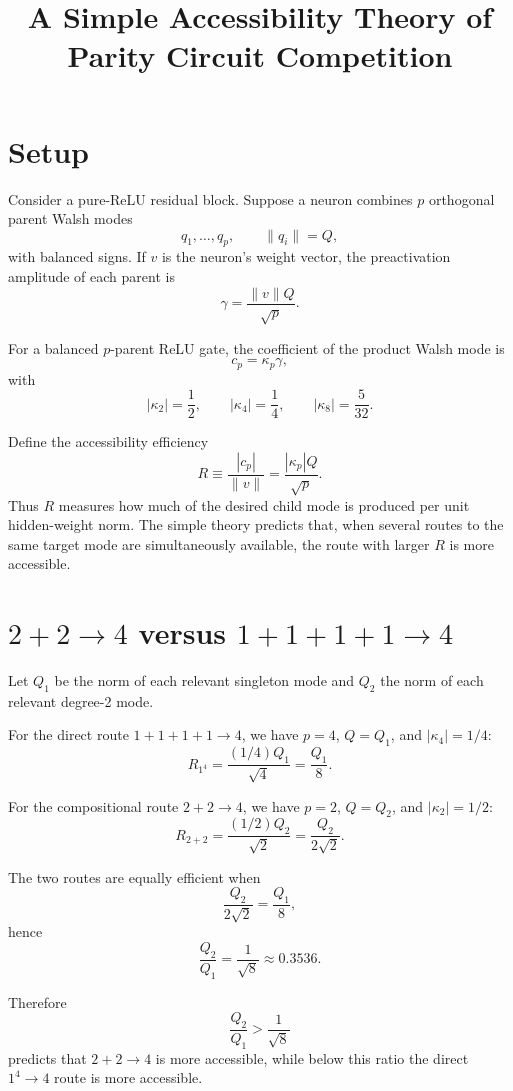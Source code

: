 \documentclass[11pt]{article}
\title{A Simple Accessibility Theory of Parity Circuit Competition}
\date{}
\begin{document}
\maketitle

\section{Setup}

Consider a pure-ReLU residual block. Suppose a neuron combines \(p\) orthogonal parent Walsh modes
\[
q_1,\ldots,q_p,\qquad \|q_i\|=Q,
\]
with balanced signs. If \(v\) is the neuron's weight vector, the preactivation amplitude of each parent is
\[
\gamma=\frac{\|v\|Q}{\sqrt p}.
\]

For a balanced \(p\)-parent ReLU gate, the coefficient of the product Walsh mode is
\[
c_p=\kappa_p\gamma,
\]
with
\[
|\kappa_2|=\frac12,\qquad
|\kappa_4|=\frac14,\qquad
|\kappa_8|=\frac{5}{32}.
\]

Define the accessibility efficiency
\[
R\equiv \frac{|c_p|}{\|v\|}
=\frac{|\kappa_p|Q}{\sqrt p}.
\]
Thus \(R\) measures how much of the desired child mode is produced per unit hidden-weight norm. The simple theory predicts that, when several routes to the same target mode are simultaneously available, the route with larger \(R\) is more accessible.

\section{\texorpdfstring{\(2+2\to4\)}{2+2 to 4} versus \texorpdfstring{\(1+1+1+1\to4\)}{1+1+1+1 to 4}}

Let \(Q_1\) be the norm of each relevant singleton mode and \(Q_2\) the norm of each relevant degree-2 mode.

For the direct route \(1+1+1+1\to4\), we have \(p=4\), \(Q=Q_1\), and \(|\kappa_4|=1/4\):
\[
R_{1^4}
=
\frac{(1/4)Q_1}{\sqrt4}
=
\frac{Q_1}{8}.
\]

For the compositional route \(2+2\to4\), we have \(p=2\), \(Q=Q_2\), and \(|\kappa_2|=1/2\):
\[
R_{2+2}
=
\frac{(1/2)Q_2}{\sqrt2}
=
\frac{Q_2}{2\sqrt2}.
\]

The two routes are equally efficient when
\[
\frac{Q_2}{2\sqrt2}
=
\frac{Q_1}{8},
\]
hence
\[
\boxed{
\frac{Q_2}{Q_1}
=
\frac{1}{\sqrt8}
\approx 0.3536.
}
\]

Therefore
\[
\frac{Q_2}{Q_1}>\frac1{\sqrt8}
\]
predicts that \(2+2\to4\) is more accessible, while below this ratio the direct \(1^4\to4\) route is more accessible.
\end{document}
